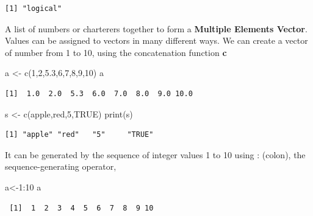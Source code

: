\documentclass[
  letterpaper,
  DIV=11,
  numbers=noendperiod]{scrreprt}
\newenvironment{Shaded}{\begin{snugshade}}{\end{snugshade}}
\newcommand{\ConstantTok}[1]{\textcolor[rgb]{0.56,0.35,0.01}{#1}}
\newcommand{\DecValTok}[1]{\textcolor[rgb]{0.68,0.00,0.00}{#1}}
\newcommand{\FloatTok}[1]{\textcolor[rgb]{0.68,0.00,0.00}{#1}}
\newcommand{\FunctionTok}[1]{\textcolor[rgb]{0.28,0.35,0.67}{#1}}
\newcommand{\NormalTok}[1]{\textcolor[rgb]{0.00,0.23,0.31}{#1}}
\newcommand{\OtherTok}[1]{\textcolor[rgb]{0.00,0.23,0.31}{#1}}
\newcommand{\SpecialCharTok}[1]{\textcolor[rgb]{0.37,0.37,0.37}{#1}}
\newcommand{\StringTok}[1]{\textcolor[rgb]{0.13,0.47,0.30}{#1}}
\begin{document}
\begin{verbatim}
[1] "logical"
\end{verbatim}

A list of numbers or charterers together to form a \textbf{Multiple
Elements Vector}. Values can be assigned to vectors in many different
ways. We can create a vector of number from 1 to 10, using the
concatenation function \textbf{c}

\begin{Shaded}
\begin{Highlighting}[]
\NormalTok{a }\OtherTok{\textless{}{-}} \FunctionTok{c}\NormalTok{(}\DecValTok{1}\NormalTok{,}\DecValTok{2}\NormalTok{,}\FloatTok{5.3}\NormalTok{,}\DecValTok{6}\NormalTok{,}\DecValTok{7}\NormalTok{,}\DecValTok{8}\NormalTok{,}\DecValTok{9}\NormalTok{,}\DecValTok{10}\NormalTok{)}
\NormalTok{a}
\end{Highlighting}
\end{Shaded}

\begin{verbatim}
[1]  1.0  2.0  5.3  6.0  7.0  8.0  9.0 10.0
\end{verbatim}

\begin{Shaded}
\begin{Highlighting}[]
\NormalTok{s }\OtherTok{\textless{}{-}} \FunctionTok{c}\NormalTok{(}\StringTok{\textquotesingle{}apple\textquotesingle{}}\NormalTok{,}\StringTok{\textquotesingle{}red\textquotesingle{}}\NormalTok{,}\DecValTok{5}\NormalTok{,}\ConstantTok{TRUE}\NormalTok{)}
\FunctionTok{print}\NormalTok{(s)}
\end{Highlighting}
\end{Shaded}

\begin{verbatim}
[1] "apple" "red"   "5"     "TRUE" 
\end{verbatim}

It can be generated by the sequence of integer values 1 to 10 using :
(colon), the sequence-generating operator,

\begin{Shaded}
\begin{Highlighting}[]
\NormalTok{a}\OtherTok{\textless{}{-}}\DecValTok{1}\SpecialCharTok{:}\DecValTok{10}
\NormalTok{a}
\end{Highlighting}
\end{Shaded}

\begin{verbatim}
 [1]  1  2  3  4  5  6  7  8  9 10
\end{verbatim}
\end{document}
